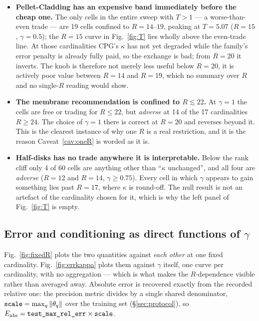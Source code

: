 \documentclass[11pt,a4paper]{article}
\begin{document}
\begin{itemize}
\item \textbf{Pellet-Cladding has an expensive band immediately before the cheap one.}
The only cells in the entire sweep with $T>1$ --- a worse-than-even trade --- are 19
cells confined to $R=14$--$19$, peaking at $T=5.07$ ($R=15$, $\gamma=0.5$); the $R=15$
curve in Fig.~\ref{fig:T} lies wholly above the even-trade line. At those
cardinalities CPG's $\kappa$ has not yet degraded while the family's error penalty is
already fully paid, so the exchange is bad; from $R=20$ it inverts. The knob is therefore
not merely less useful below $R=20$, it is actively poor value between $R=14$ and $R=19$,
which no summary over $R$ and no single-$R$ reading would show.
\item \textbf{The membrane recommendation is confined to $R\lesssim22$.} At $\gamma=1$ the
cells are free or trading for $R\le22$, but \emph{adverse} at 14 of the 17 cardinalities
$R\ge24$. The choice of $\gamma=1$ there is correct at $R=20$ and reverses beyond it. This
is the clearest instance of why one $R$ is a real restriction, and it is the reason
Caveat~\ref{cav:oneR} is worded as it is.
\item \textbf{Half-disks has no trade anywhere it is interpretable.} Below the rank
cliff only 4 of 60 cells are anything other than ``$\kappa$ unchanged'', and all four are
\emph{adverse} ($R=12$ and $R=14$, $\gamma\ge0.75$). Every cell in which $\gamma$ appears
to gain something lies past $R=17$, where $\kappa$ is round-off. The null result is not an
artefact of the cardinality chosen for it, which is why the left panel of
Fig.~\ref{fig:T} is empty.
\end{itemize}

\subsection{Error and conditioning as direct functions of $\gamma$}\label{sec:gammadirect}

Fig.~\ref{fig:fixedR} plots the two quantities against \emph{each other} at one fixed
cardinality. Fig.~\ref{fig:errkappa} plots them against
$\gamma$ itself, one curve per cardinality, with no aggregation --- which is what makes
the $R$-dependence visible rather than averaged away. Absolute error is recovered exactly
from the recorded relative one: the precision metric divides by a single shared
denominator, $\text{\texttt{scale}}=\max_q\|\theta_q\|$ over the training set
(\S\ref{sec:protocol}), so $E_{\mathrm{abs}}=\text{\texttt{test\_max\_rel\_err}}\times
\text{\texttt{scale}}$.
\end{document}
